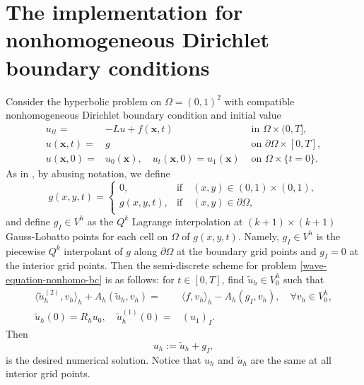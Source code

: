 \documentclass[onefignum,onetabnum]{siamart171218}
\begin{document}
\section{The implementation for nonhomogeneous Dirichlet boundary conditions}\label{implementation-nonhom}
Consider  the  hyperbolic problem on $\Omega=(0,1)^2$ with compatible nonhomogeneous Dirichlet boundary condition and initial value
\begin{equation}\label{wave-equation-nonhomo-bc}
\begin{aligned}
u_{tt}
 = & -Lu + f(\mathbf x,t) & \text{ in } \Omega \times (0,T], \\
u(\mathbf x,t)  = & g &\text{ on } \partial\Omega \times [0,T], \\
u(\mathbf x,0) = & u_0(\mathbf x) ,\quad u_t(\mathbf x,0) = u_1(\mathbf x) &\text{ on } \Omega\times\{t=0\}.
\end{aligned}
\end{equation}
As in \cite{gockenbach2006understanding, li2020superconvergence}, by abusing notation, we define
\[g(x,y,t)=\begin{cases}
   0,& \mbox{if}\quad (x,y)\in (0,1)\times(0,1),\\
   g(x,y,t),& \mbox{if}\quad (x,y)\in \partial\Omega,\\
  \end{cases}
\] 
and
define $g_I\in V^h$  as the $Q^k$ Lagrange interpolation at $(k+1)\times (k+1)$ Gauss-Lobatto points for each cell on $  \Omega$ of $g(x,y,t)$.
Namely, $g_I\in V^h$ is the piecewise $Q^k$ interpolant   of $g$ along $\partial\Omega$ at the boundary grid points and $g_I=0$ at the interior grid points. 
Then the semi-discrete scheme for problem \eqref{wave-equation-nonhomo-bc} is as follows: for $t\in[0,T]$, find $\tilde u_h\in V^h_0$ such that
 \begin{equation}\label{wave-scheme-nonhomo-bc}
\begin{aligned}
\langle \tilde u_h^{(2)}, v_h \rangle_h + A_h(\tilde u_h, v_h) = & \langle f, v_h \rangle_h- A_h(g_I,v_h),\quad  \forall v_h \in V^h_0,\\
\tilde u_h(0) = R_hu_0, \quad \tilde u_h^{(1)}(0) = & (u_1)_I.
\end{aligned}
\end{equation}
Then 
\begin{equation}
u_h := \tilde u_h + g_I,
\end{equation}
is the desired numerical solution. Notice that $u_h$ and $\tilde u_h$ are the same at all interior grid points. 
\end{document}
